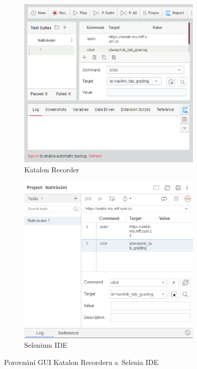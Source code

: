 \documentclass[12pt, a4paper, twoside]{article}
\begin{document}
	\begin{figure}[H]
		\begin{subfigure}{0.49\textwidth}
			\includegraphics[width=0.97\textwidth]{katalonRecorderUi.png}
			\caption{Katalon Recorder}
		\end{subfigure} \hfill
		\begin{subfigure}{0.49\textwidth}
			\includegraphics[width=0.97\textwidth, center]{seleniumIdeUi.png}
			\caption{Selenium IDE}
		\end{subfigure}
		\caption{Porovnání GUI Katalon Recorderu a~Selenia IDE}
	\end{figure}
	
\end{document}
